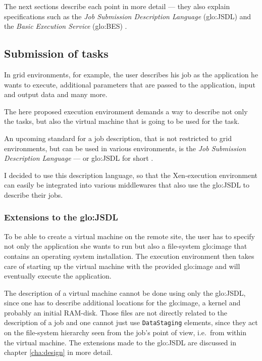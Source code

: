 The next sections describe each point in more detail --- they also explain
specifications  such  as the  \emph{Job  Submission Description  Language}
(\gls{glo:JSDL}) \cite{jsdl-spec}  and the \emph{Basic  Execution Service}
(\gls{glo:BES}) \cite{ogsa-bes}.

\subsection{Submission of tasks}
\label{sec:req-task-submission}

In  grid environments,  for example,  the user  describes his  job  as the
application he wants to execute,  additional parameters that are passed to
the application, input and output data and many more.

The here proposed execution environment demands a way to describe not only
the tasks, but also  the virtual machine that is going to  be used for the
task.

An upcoming standard for a job description, that is not restricted to grid
environments, but  can be used  in various environments, is  the \emph{Job
  Submission  Description  Language}   ---  or  \gls{glo:JSDL}  for  short
\cite{jsdl-spec}.

I  decided to  use this  description language,  so that  the Xen-execution
environment can  easily be integrated  into various middlewares  that also
use the \gls{glo:JSDL} to describe their jobs.


\subsubsection{Extensions to the \gls{glo:JSDL}}

To be able to create a virtual machine on the remote site, the user has to
specify not only  the application she wants to run  but also a file-system
\gls{glo:image}  that  contains  an  operating system  installation.   The
execution environment then  takes care of starting up  the virtual machine
with  the  provided  \gls{glo:image}   and  will  eventually  execute  the
application.

The  description  of a  virtual  machine cannot  be  done  using only  the
\gls{glo:JSDL},  since one has  to describe  additional locations  for the
\gls{glo:image}, a  kernel and probably an initial  RAM-disk.  Those files
are not directly  related to the description of a job  and one cannot just
use  \texttt{DataStaging}  elements, since  they  act  on the  file-system
hierarchy seen from the job's  point of view, i.e.~from within the virtual
machine.   The extensions  made  to the  \gls{glo:JSDL}  are discussed  in
chapter \ref{cha:design} in more detail.

